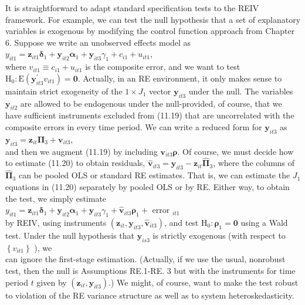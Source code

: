\documentclass[10pt]{article}
\begin{document}
It is straightforward to adapt standard specification tests to the REIV framework. For example, we can test the null hypothesis that a set of explanatory variables is exogenous by modifying the control function approach from Chapter 6. Suppose we write an unobserved effects model as\\
$y_{i t 1}=\mathbf{z}_{i t 1} \boldsymbol{\delta}_{1}+\mathbf{y}_{i t 2} \boldsymbol{\alpha}_{1}+\mathbf{y}_{i t 3} \gamma_{1}+c_{i 1}+u_{i t 1}$,\\
where $v_{i t 1} \equiv c_{i 1}+u_{i t 1}$ is the composite error, and we want to test $\mathrm{H}_{0}: \mathrm{E}\left(\mathbf{y}_{i t 3}^{\prime} v_{i t 1}\right)=\mathbf{0}$. Actually, in an RE environment, it only makes sense to maintain strict exogeneity of the $1 \times J_{1}$ vector $\mathbf{y}_{i t 3}$ under the null. The variables $\mathbf{y}_{i t 2}$ are allowed to be endogenous under the null-provided, of course, that we have sufficient instruments excluded from (11.19) that are uncorrelated with the composite errors in every time period. We can write a reduced form for $\mathbf{y}_{i t 3}$ as\\
$\mathbf{y}_{i t 3}=\mathbf{z}_{i t} \boldsymbol{\Pi}_{3}+\mathbf{v}_{i t 3}$,\\
and then we augment (11.19) by including $\mathbf{v}_{i t 3} \boldsymbol{\rho}$. Of course, we must decide how to estimate (11.20) to obtain residuals, $\hat{\mathbf{v}}_{i t 3}=\mathbf{y}_{i t 3}-\mathbf{z}_{i t} \hat{\boldsymbol{\Pi}}_{3}$, where the columns of $\hat{\boldsymbol{\Pi}}_{3}$ can be pooled OLS or standard RE estimates. That is, we can estimate the $J_{1}$ equations in (11.20) separately by pooled OLS or by RE. Either way, to obtain the test, we simply estimate\\
$y_{i t 1}=\mathbf{z}_{i t 1} \boldsymbol{\delta}_{1}+\mathbf{y}_{i t 2} \boldsymbol{\alpha}_{1}+\mathbf{y}_{i t 3} \gamma_{1}+\hat{\mathbf{v}}_{i t 3} \boldsymbol{\rho}_{1}+$ error $_{i t 1}$\\
by REIV, using instruments $\left(\mathbf{z}_{i t}, \mathbf{y}_{i t 3}, \hat{\mathbf{v}}_{i t 3}\right)$, and test $\mathrm{H}_{0}: \boldsymbol{\rho}_{1}=\mathbf{0}$ using a Wald test. Under the null hypothesis that $\mathbf{y}_{i s 3}$ is strictly exogenous (with respect to $\left\{v_{i t 1}\right\}$ ), we\\
can ignore the first-stage estimation. (Actually, if we use the usual, nonrobust test, then the null is Assumptions RE.1-RE. 3 but with the instruments for time period $t$ given by $\left(\mathbf{z}_{i t}, \mathbf{y}_{i t 3}\right)$.) We might, of course, want to make the test robust to violation of the RE variance structure as well as to system heteroskedasticity.
\end{document}
